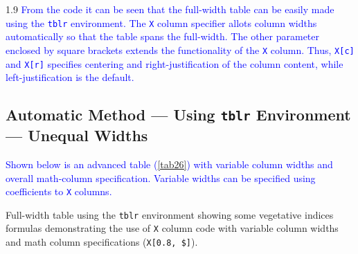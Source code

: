 \documentclass[phd]{ndsu-thesis-2022}
\newcommand\myspacing{1.9} %
\newcommand\italk[1]{\textcolor{blue}{#1}}  %
\newcommand\vb[1]{\textcolor{blue}{\texttt{#1}}}%
\begin{document}
\begin{spacing}{\myspacing}
\italk{From the code it can be seen that the full-width table can be easily made using the \vb{tblr} environment. The \vb{X} column specifier allots column widths automatically so that the table spans the full-width. The other parameter enclosed by square brackets extends the functionality of the \vb{X} column. Thus, \vb{X[c]} and \vb{X[r]} specifies centering and right-justification of the column content, while left-justification is the default.}

\subsection{Automatic Method --- Using \texttt{tblr} Environment --- Unequal Widths}

\italk{Shown below is an advanced table (\cref{tab26}) with variable column widths and overall math-column specification. Variable widths can be specified using coefficients to \vb{X} columns. 
}
\vspace{-4ex}
\begin{table}[ht]
\caption{Full-width table using the \texttt{tblr} environment showing some vegetative indices formulas demonstrating the use of \texttt{X} column code with variable column widths and math column specifications (\texttt{X[0.8, \$]}).}


\end{table}
\end{spacing}
\end{document}
